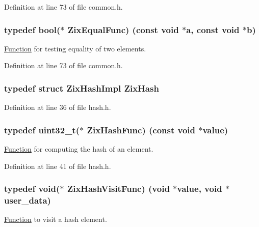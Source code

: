 Definition at line 73 of file common.\+h.

\subsubsection[{\texorpdfstring{Zix\+Equal\+Func}{ZixEqualFunc}}]{\setlength{\rightskip}{0pt plus 5cm}typedef {\bf bool}($\ast$ Zix\+Equal\+Func) ({\bf const} {\bf void} $\ast${\bf a}, {\bf const} {\bf void} $\ast${\bf b})}\hypertarget{group__zix_ga4cb30cbc7c5989a17b2b73ee23f63686}{}\label{group__zix_ga4cb30cbc7c5989a17b2b73ee23f63686}
\hyperlink{class_function}{Function} for testing equality of two elements. 

Definition at line 73 of file common.\+h.

\subsubsection[{\texorpdfstring{Zix\+Hash}{ZixHash}}]{\setlength{\rightskip}{0pt plus 5cm}typedef struct {\bf Zix\+Hash\+Impl} {\bf Zix\+Hash}}\hypertarget{group__zix_ga7bcf5a36494242a0570b0d5c6f9e171b}{}\label{group__zix_ga7bcf5a36494242a0570b0d5c6f9e171b}


Definition at line 36 of file hash.\+h.

\subsubsection[{\texorpdfstring{Zix\+Hash\+Func}{ZixHashFunc}}]{\setlength{\rightskip}{0pt plus 5cm}typedef {\bf uint32\+\_\+t}($\ast$ Zix\+Hash\+Func) ({\bf const} {\bf void} $\ast${\bf value})}\hypertarget{group__zix_ga42772c8370d1039115cca0504a225aee}{}\label{group__zix_ga42772c8370d1039115cca0504a225aee}
\hyperlink{class_function}{Function} for computing the hash of an element. 

Definition at line 41 of file hash.\+h.

\subsubsection[{\texorpdfstring{Zix\+Hash\+Visit\+Func}{ZixHashVisitFunc}}]{\setlength{\rightskip}{0pt plus 5cm}typedef {\bf void}($\ast$ Zix\+Hash\+Visit\+Func) ({\bf void} $\ast${\bf value}, {\bf void} $\ast$user\+\_\+data)}\hypertarget{group__zix_ga458305f092f4cce9cccf4004a0fa3d82}{}\label{group__zix_ga458305f092f4cce9cccf4004a0fa3d82}
\hyperlink{class_function}{Function} to visit a hash element. 

